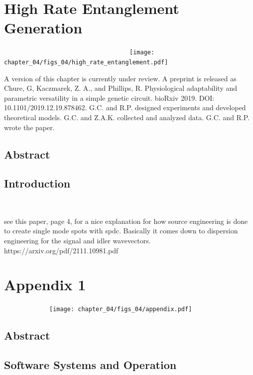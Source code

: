\documentclass[12pt]{caltech_thesis}
\begin{document}
\hypertarget{high-rate-entanglement-generation}{%
\chapter{High Rate Entanglement
Generation}\label{high-rate-entanglement-generation}}

~~~~~~~~~~~~~~~~~~~~~~~~~~~~~~~~~~~~\texttt{[image: chapter\_04/figs\_04/high\_rate\_entanglement.pdf]}

A version of this chapter is currently under review. A preprint is
released as Chure, G, Kaczmarek, Z. A., and Phillips, R. Physiological
adaptability and parametric versatility in a simple genetic circuit.
bioRxiv 2019. DOI: 10.1101/2019.12.19.878462. G.C. and R.P. designed
experiments and developed theoretical models. G.C. and Z.A.K. collected
and analyzed data. G.C. and R.P. wrote the paper.

\hypertarget{abstract-3}{%
\section{Abstract}\label{abstract-3}}

\hypertarget{introduction-3}{%
\section{Introduction}\label{introduction-3}}

~~~~~

see this paper, page 4, for a nice explanation for how source
engineering is done to create single mode spots with spdc. Basically it
comes down to dispersion engineering for the signal and idler
wavevectors. https://arxiv.org/pdf/2111.10981.pdf

\hypertarget{appendix-1}{%
\chapter{Appendix 1}\label{appendix-1}}

~~~~~~~~~~~~~\texttt{[image: chapter\_04/figs\_04/appendix.pdf]}

\hypertarget{abstract-4}{%
\section{Abstract}\label{abstract-4}}

\hypertarget{software-systems-and-operation}{%
\section{Software Systems and
Operation}\label{software-systems-and-operation}}
\end{document}
